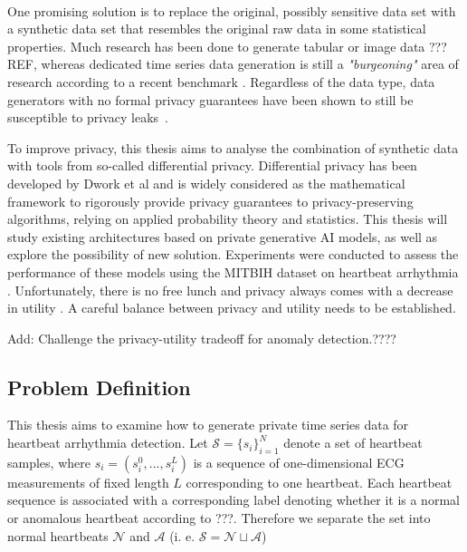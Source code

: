 \paragraph{}
One promising solution \parencite[see][]{jordon2022synthetic} is to replace the original, possibly sensitive data set with a synthetic data set that resembles the original raw data in some statistical properties. Much research has been done to generate tabular or image data ???REF, whereas dedicated time series data generation is still a \textit{"burgeoning"} area of research according to a recent benchmark \parencite[][]{ang2023tsgbench}. Regardless of the data type, data generators with no formal privacy guarantees have been shown to still be susceptible to privacy leaks~\cite{stadler2022synthetic}. 

To improve privacy, this thesis aims to analyse the combination of synthetic data with tools from so-called differential privacy. Differential privacy has been developed by Dwork et al \parencite{dwork2006differential} and is widely considered as the mathematical framework to rigorously provide privacy guarantees to privacy-preserving algorithms, relying on applied probability theory and statistics. This thesis will study existing architectures based on private generative AI models, as well as explore the possibility of new solution. Experiments were conducted to assess the performance of these models using the MITBIH dataset on heartbeat arrhythmia \parencite[][]{moody2001impact}. Unfortunately, there is no free lunch and privacy always comes with a decrease in utility \cite{stadler2022synthetic}. A careful balance between privacy and utility needs to be established.

Add: Challenge the privacy-utility tradeoff for anomaly detection.????

\subsection{Problem Definition}

This thesis aims to examine how to generate private time series data for heartbeat arrhythmia detection. Let $\mathcal{S}=\{s_i\}_{i=1}^N$ denote a set of heartbeat samples, where $s_i=(s_i^0,..., s_i^L)$ is a sequence of one-dimensional ECG measurements of fixed length $L$ corresponding to one heartbeat. Each heartbeat sequence is associated with a corresponding label denoting whether it is a normal or anomalous heartbeat according to ???. Therefore we separate the set into normal heartbeats $\mathcal{N}$ and $\mathcal{A}$ (i. e. $\mathcal{S} = \mathcal{N} \sqcup \mathcal{A}$)

